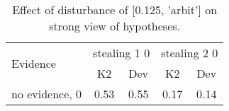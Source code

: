 \begin{table}\begin{tabular}{l|cc|cc}\toprule\multirow{2}{*}{Evidence} & \multicolumn{2}{c}{stealing 1 0}& \multicolumn{2}{c}{stealing 2 0}\\& {K2} & {Dev}& {K2} & {Dev}\\\midrule
no evidence, 0 & 0.53&0.55&0.17&0.14\\\bottomrule\end{tabular}\caption{Effect of disturbance of [0.125, 'arbit'] on strong view of hypotheses.}\end{table}